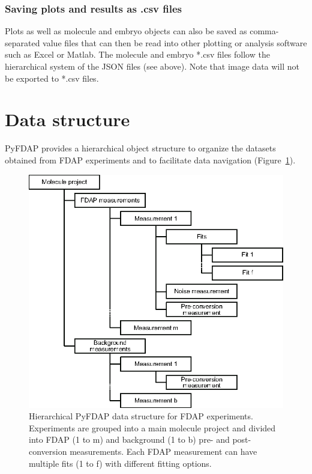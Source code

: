 \documentclass[a4paper,11pt]{article}
\begin{document}
\subsubsection{Saving plots and results as .csv files}
Plots as well as molecule and embryo objects can also be saved as comma-separated value files that can then be read into other plotting or analysis software such as Excel or Matlab. The molecule and embryo *.csv files follow the hierarchical system of the JSON files (see above). Note that image data will not be exported to *.csv files.

\section{Data structure}
\label{sec:structure}
PyFDAP provides a hierarchical object structure to organize the datasets obtained from FDAP experiments and to facilitate data navigation (Figure~\ref{fig:structure}).

\begin{figure} [H]
 \centering
 \includegraphics[scale=1.0]{figs/Blaessle_Figure1.eps}
\caption{Hierarchical PyFDAP data structure for FDAP experiments. Experiments are grouped into a main molecule project and divided into FDAP (1 to m) and background (1 to b) pre- and post-conversion measurements. Each FDAP measurement can have multiple fits (1 to f) with different fitting options.}
\label{fig:structure}
 \end{figure}
\end{document}
